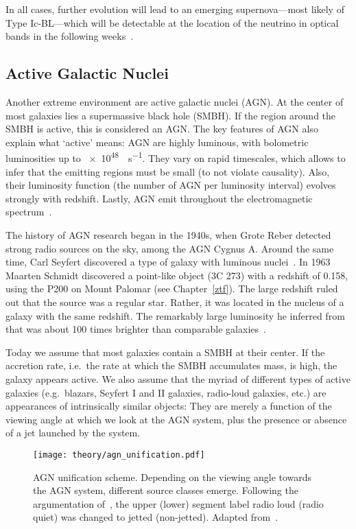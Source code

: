 In all cases, further evolution will lead to an emerging supernova---most likely of Type Ic-BL---which will be detectable at the location of the neutrino in optical bands in the following weeks~.

\subsection{Active Galactic Nuclei}\label{agn}
Another extreme environment are active galactic nuclei (AGN). At the center of most galaxies lies a supermassive black hole (SMBH). If the region around the SMBH is active, this is considered an AGN\@. The key features of AGN also explain what `active' means: AGN are highly luminous, with bolometric luminosities up to \SI{e48}{\erg\per\s}. They vary on rapid timescales, which allows to infer that the emitting regions must be small (to not violate causality). Also, their luminosity function (the number of AGN per luminosity interval) evolves strongly with redshift. Lastly, AGN emit throughout the electromagnetic spectrum~.

The history of AGN research began in the 1940s, when Grote Reber detected strong radio sources on the sky, among the AGN Cygnus A. Around the same time, Carl Seyfert discovered a type of galaxy with luminous nuclei~. In 1963 Maarten Schmidt discovered a point-like object (3C 273) with a redshift of 0.158, using the P200 on Mount Palomar (see Chapter~\ref{ztf}). The large redshift ruled out that the source was a regular star. Rather, it was located in the nucleus of a galaxy with the same redshift. The remarkably large luminosity he inferred from that was about 100 times brighter than comparable galaxies~.

Today we assume that most galaxies contain a SMBH at their center. If the accretion rate, i.e.\ the rate at which the SMBH accumulates mass, is high, the galaxy appears active. We also assume that the myriad of different types of active galaxies (e.g.\ blazars, Seyfert I and II galaxies, radio-loud galaxies, etc.) are appearances of intrinsically similar objects: They are merely a function of the viewing angle at which we look at the AGN system, plus the presence or absence of a jet launched by the system.

\begin{figure}[htb]
    \texttt{[image: theory/agn\_unification.pdf]}
    \caption[AGN]{AGN unification scheme. Depending on the viewing angle towards the AGN system, different source classes emerge. Following the argumentation of~\cite{Padovani2017}, the upper (lower) segment label radio loud (radio quiet) was changed to jetted (non-jetted). Adapted from~\cite{Thorne2022}.}
\end{figure}

